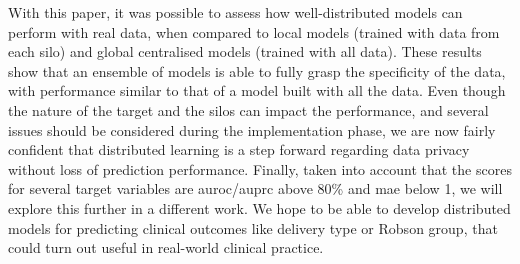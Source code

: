 
With this paper, it was possible to assess how well-distributed models can perform with real data, when compared to local models (trained with data from each silo) and global centralised models (trained with all data). These results show that an ensemble of models is able to fully grasp the specificity of the data, with performance similar to that of a model built with all the data. Even though the nature of the target and the silos can impact the performance, and several issues should be considered during the implementation phase, we are now fairly confident that distributed learning is a step forward regarding data privacy without loss of prediction performance.
Finally, taken into account that the scores for several target variables are \ac{auroc}/\ac{auprc} above 80\% and \ac{mae} below 1, we will explore this further in a different work. We hope to be able to develop distributed models for predicting clinical outcomes like delivery type or Robson group, that could turn out useful in real-world clinical practice.


